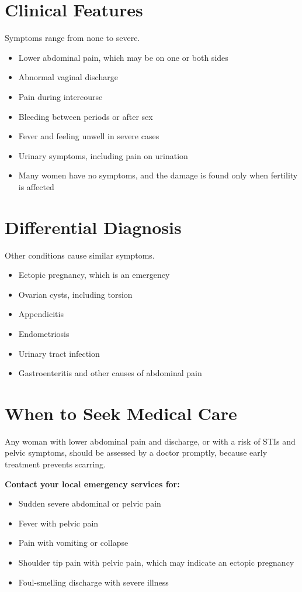 \section*{Clinical Features}
Symptoms range from none to severe.
\begin{itemize}
    \item Lower abdominal pain, which may be on one or both sides
    \item Abnormal vaginal discharge
    \item Pain during intercourse
    \item Bleeding between periods or after sex
    \item Fever and feeling unwell in severe cases
    \item Urinary symptoms, including pain on urination
    \item Many women have no symptoms, and the damage is found only when fertility is affected
\end{itemize}

\section*{Differential Diagnosis}
Other conditions cause similar symptoms.
\begin{itemize}
    \item Ectopic pregnancy, which is an emergency
    \item Ovarian cysts, including torsion
    \item Appendicitis
    \item Endometriosis
    \item Urinary tract infection
    \item Gastroenteritis and other causes of abdominal pain
\end{itemize}

\section*{When to Seek Medical Care}
Any woman with lower abdominal pain and discharge, or with a risk of STIs and pelvic symptoms, should be assessed by a doctor promptly, because early treatment prevents scarring.

\textbf{Contact your local emergency services for:}
\begin{itemize}
    \item Sudden severe abdominal or pelvic pain
    \item Fever with pelvic pain
    \item Pain with vomiting or collapse
    \item Shoulder tip pain with pelvic pain, which may indicate an ectopic pregnancy
    \item Foul-smelling discharge with severe illness
\end{itemize}

